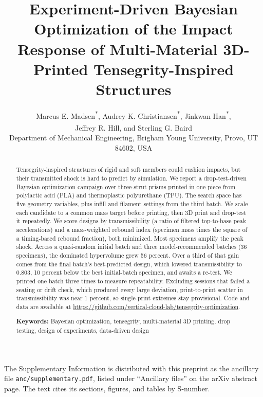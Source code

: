 \documentclass[11pt]{article}
\title{Experiment-Driven Bayesian Optimization of the Impact Response of
  Multi-Material 3D-Printed Tensegrity-Inspired Structures}
\author{Marcus E. Madsen\textsuperscript{*}, Audrey K.
  Christiansen\textsuperscript{*}, Jinkwan Han\textsuperscript{*},\\
  Jeffrey R. Hill\textsuperscript{\dag\ddag}, and Sterling G.
  Baird\textsuperscript{\dag\ddag}\\[6pt]
  {\small Department of Mechanical Engineering, Brigham Young University,
  Provo, UT 84602, USA}}
\date{}
\newcommand{\repo}{https://github.com/vertical-cloud-lab/tensegrity-optimization}
\begin{document}
\maketitle

\begingroup
\renewcommand{\thefootnote}{}%
%
\endgroup

\begin{abstract}
Tensegrity-inspired structures of rigid and soft members could cushion
impacts, but their transmitted shock is hard to predict by simulation.
We report a drop-test-driven Bayesian optimization campaign over
three-strut prisms printed in one piece from polylactic acid (PLA) and
thermoplastic polyurethane (TPU). The search space has five geometry
variables, plus infill and filament settings from the third
batch. We scale each candidate to a common mass target before
printing, then 3D print and drop-test it repeatedly. We score
designs by transmissibility (a ratio of filtered top-to-base
peak accelerations) and a mass-weighted rebound index (specimen mass
times the square of a timing-based rebound fraction), both minimized.
Most specimens amplify the peak shock. Across a quasi-random initial batch
and three model-recommended batches (36 specimens), the dominated
hypervolume grew 56 percent. Over a third of that gain comes from the
final batch's best-predicted design, which lowered transmissibility to
0.803, 10 percent below the best initial-batch specimen, and awaits a
re-test. We printed one batch three times to measure repeatability.
Excluding sessions that failed a seating or drift check, which produced
every large deviation, print-to-print scatter in transmissibility was
near 1 percent, so single-print extremes stay provisional. Code and data
are available at \url{\repo}.

\medskip
\noindent\textbf{Keywords:} Bayesian optimization, tensegrity,
multi-material 3D printing, drop testing, design of experiments,
data-driven design
\end{abstract}

\noindent The Supplementary Information is distributed with this preprint
as the ancillary file \texttt{anc/supplementary.pdf}, listed under
``Ancillary files'' on the arXiv abstract page. The text cites its
sections, figures, and tables by S-number.
\end{document}
